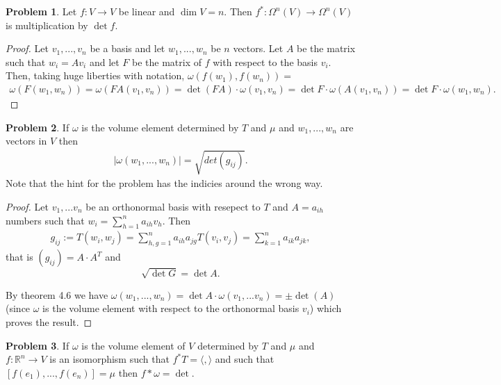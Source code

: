 \documentclass[20pt]{article}
\theoremstyle{plain}
\theoremstyle{definition}
\newtheorem*{problem}{Problem}
\newcommand{\reals}{\mathbb{R}}
\begin{document}
  \begin{problem}{4.2}
    Let $f: V \to V$ be linear and $\dim V = n$.
    Then $f^*: \Omega^n(V) \to \Omega^n(V)$ is multiplication by $\det f$.
  \end{problem}

  \begin{proof}
    Let $v_1, ..., v_n$ be a basis and let $w_1, ..., w_n$ be $n$ vectors.
    Let $A$ be the matrix such that $w_i = Av_i$ and let $F$ be the matrix 
    of $f$ with respect to the basis $v_i$.  Then, taking huge liberties with 
    notation, $\omega(f(w_1), f(w_n)) = $
    \begin{align*}
      \omega(F(w_1,w_n)) = 
      \omega(FA(v_1,v_n)) = 
      \det(FA)\cdot \omega(v_1, v_n) = 
      \det F \cdot \omega(A(v_1, v_n)) = 
      \det F \cdot \omega(w_1, w_n).
    \end{align*}
  \end{proof}


  \begin{problem}{4.3}
    If $\omega$ is the volume element determined by $T$ and $\mu$ and $w_1, ..., w_n$ are vectors in $V$ then 
    \begin{align*}
      |\omega(w_1, ..., w_n)| = \sqrt{det(g_{ij})}.
    \end{align*}    
    \color{Blue}
    Note that the hint for the problem has the indicies around the wrong way.
  \end{problem}
  \begin{proof}
    Let $v_1, ...v_n$ be an orthonormal basis with resepect to $T$ and $A = a_{ih}$ numbers such that 
    $w_i = \sum_{h=1}^n a_{ih}v_h$.
    Then 
    \begin{align*}
      g_{ij} := T(w_i, w_j) = \sum_{h,g=1}^n a_{ih}a_{jg}T(v_i, v_j) = \sum_{k=1}^n a_{ik}a_{jk},
    \end{align*}
    that is $(g_{ij}) = A\cdot A^T$ and
    $$\sqrt{\det G} = \det A.$$

    By theorem 4.6 we have 
    $ \omega(w_1, ..., w_n) = \det A \cdot \omega(v_1, ...v_n) = \pm \det(A)$
    (since $\omega$ is the volume element with respect to the orthonormal basis $v_i$) which proves the result.
  \end{proof}



\begin{problem}{4.4}
  If $\omega$ is the volume element of $V$ determined by $T$ and $\mu$ and
  $f: \reals^n \to V$ is an isomorphism such that $f^*T = \langle, \rangle$ and such that 
  $[f(e_1), ..., f(e_n)] = \mu$ then $f*\omega = \det.$
\end{problem}
\end{document}

